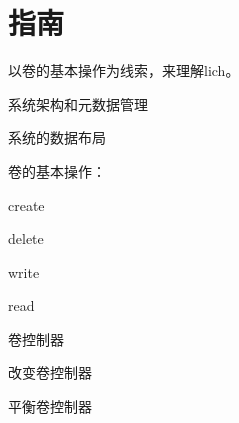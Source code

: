 \chapter{指南}

以卷的基本操作为线索，来理解lich。

系统架构和元数据管理

系统的数据布局

卷的基本操作：
\begin{compactenum}
\item create
\item delete
\item write
\item read
\end{compactenum}

卷控制器
\begin{compactenum}
\item 改变卷控制器
\item 平衡卷控制器
\end{compactenum}
